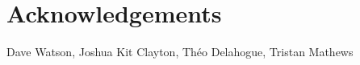 \documentclass[twoside,10pt]{article}
\begin{document}


\section{Acknowledgements} %

Dave Watson, Joshua Kit Clayton, Th\'eo Delahogue, Tristan Mathews




\end{document}

